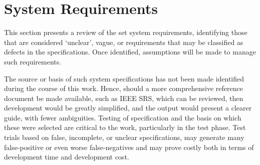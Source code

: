 \section{System Requirements}

This section presents a review of the set system requirements, identifying those that are considered ‘unclear’, vague, or requirements that may be classified as defects in the specifications.  Once identified, assumptions will be made to manage such requirements.
\par
The source or basis of such system specifications has not been made identified during the course of this work.  Hence, should a more comprehensive reference document be made available, such as IEEE SRS, which can be reviewed, then development would be greatly simplified, and the output would present a clearer guide, with fewer ambiguities. Testing of specification and the basis on which these were selected are critical to the work, particularly in the test phase. Test trials based on false, incomplete, or unclear specifications, may generate many false-positive or even worse false-negatives and may prove costly both in terms of development time and development cost.


